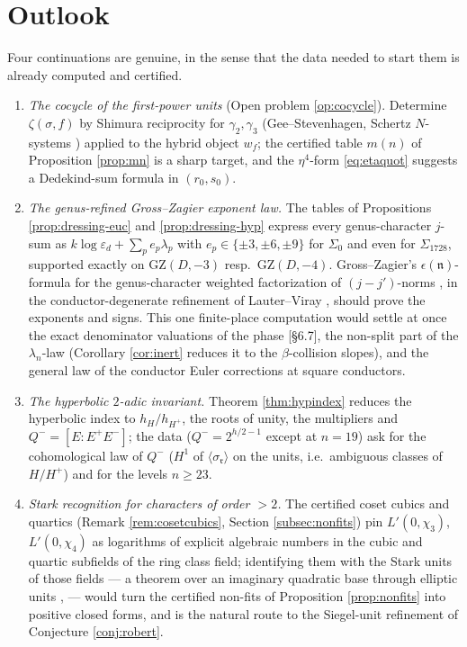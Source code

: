 \documentclass[11pt]{amsart}
\numberwithin{equation}{section}
\theoremstyle{plain}
\theoremstyle{definition}
\theoremstyle{remark}
\newcommand{\idealr}{\mathfrak{r}}
\newcommand{\GZ}{\mathrm{GZ}}
\newcommand{\eps}{\varepsilon}
\newcommand{\PaperI}{\cite{SchmidtI}}
\begin{document}
\section{Outlook}\label{sec:outlook}

Four continuations are genuine, in the sense that the data needed to
start them is already computed and certified.

\begin{enumerate}
\item \emph{The cocycle of the first-power units} (Open problem
\ref{op:cocycle}).  Determine $\zeta(\sigma, f)$ by Shimura reciprocity
for $\gamma_2, \gamma_3$ (Gee--Stevenhagen, Schertz $N$-systems
\cite{Schertz2010}) applied to the hybrid object $w_f$; the certified
table $m(n)$ of Proposition \ref{prop:mn} is a sharp target, and the
$\eta^4$-form \eqref{eq:etaquot} suggests a Dedekind-sum formula in
$(r_0, s_0)$.
\item \emph{The genus-refined Gross--Zagier exponent law.}  The tables of
Propositions \ref{prop:dressing-euc} and \ref{prop:dressing-hyp} express
every genus-character $j$-sum as $k\log\eps_d + \sum_pe_p\lambda_p$ with
$e_p \in \{\pm3, \pm6, \pm9\}$ for $\Sigma_0$ and even for
$\Sigma_{1728}$, supported exactly on $\GZ(D,-3)$ resp.\ $\GZ(D,-4)$.
Gross--Zagier's $\epsilon(\mathfrak n)$-formula for the genus-character
weighted factorization of $(j - j')$-norms \cite{GrossZagier1985}, in
the conductor-degenerate refinement of Lauter--Viray
\cite{LauterViray2015}, should prove the exponents and signs.  This one
finite-place computation would settle at once the exact denominator
valuations of the phase \PaperI[\S6.7], the non-split part of the
$\lambda_n$-law (Corollary \ref{cor:inert} reduces it to the
$\beta$-collision slopes), and the general law of the conductor Euler
corrections at square conductors.
\item \emph{The hyperbolic $2$-adic invariant.}  Theorem \ref{thm:hypindex}
reduces the hyperbolic index to $h_H/h_{H^+}$, the roots of unity, the
multipliers and $Q^- = [E:E^+E^-]$; the data ($Q^- = 2^{h/2-1}$ except at
$n = 19$) ask for the cohomological law of $Q^-$ ($H^1$ of
$\langle\sigma_\idealr\rangle$ on the units, i.e.\ ambiguous classes of
$H/H^+$) and for the levels $n \ge 23$.
\item \emph{Stark recognition for characters of order $> 2$.}  The
certified coset cubics and quartics (Remark \ref{rem:cosetcubics},
Section \ref{subsec:nonfits}) pin $L'(0,\chi_3)$, $L'(0,\chi_4)$ as
logarithms of explicit algebraic numbers in the cubic and quartic
subfields of the ring class field; identifying them with the Stark units
of those fields --- a theorem over an imaginary quadratic base through
elliptic units \cite{Stark1980}, \cite[Ch.~6--7]{Schertz2010} --- would
turn the certified non-fits of Proposition \ref{prop:nonfits} into
positive closed forms, and is the natural route to the Siegel-unit
refinement of Conjecture \ref{conj:robert}.
\end{enumerate}
\end{document}
